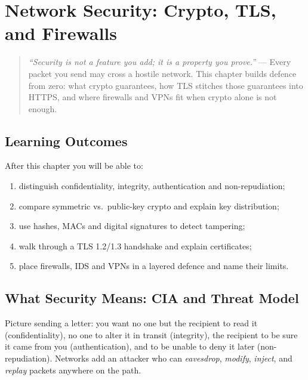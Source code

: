 \chapter{Network Security: Crypto, TLS, and Firewalls}\label{ch:security}
\begin{quote}
\emph{``Security is not a feature you add; it is a property you prove.''} --- Every packet you send may cross a hostile network. This chapter builds defence from zero: what crypto guarantees, how TLS stitches those guarantees into HTTPS, and where firewalls and VPNs fit when crypto alone is not enough.
\end{quote}

\noindent{}%
\vspace{0.4em}

\section*{Learning Outcomes}
After this chapter you will be able to:
\begin{enumerate}[label=(L\arabic*)]
    \item distinguish confidentiality, integrity, authentication and non-repudiation;
    \item compare symmetric vs.\ public-key crypto and explain key distribution;
    \item use hashes, MACs and digital signatures to detect tampering;
    \item walk through a TLS 1.2/1.3 handshake and explain certificates;
    \item place firewalls, IDS and VPNs in a layered defence and name their limits.
\end{enumerate}

\section{What Security Means: CIA and Threat Model}\label{sec:cia}
Picture sending a letter: you want no one but the recipient to read it (confidentiality), no one to alter it in transit (integrity), the recipient to be sure it came from you (authentication), and to be unable to deny it later (non-repudiation). Networks add an attacker who can \emph{eavesdrop}, \emph{modify}, \emph{inject}, and \emph{replay} packets anywhere on the path.

